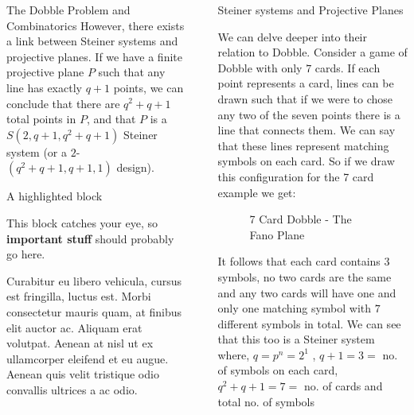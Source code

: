 \documentclass[final]{beamer}
\newlength{\sepwidth}
\newlength{\colwidth}
\newcommand{\separatorcolumn}{\begin{column}{\sepwidth}\end{column}}
\begin{document}
\begin{frame}[t]
\begin{columns}[t]
\begin{column}{\colwidth}
\begin{block}{The Dobble Problem and Combinatorics}
However, there exists a link between Steiner systems and projective planes. If we have a finite projective plane $P$ such that any line has exactly $q+1$ points, we can conclude that there are $q^2+q+1$ total points in $P$, and that $P$ is a $S(2, q+ 1, q^2 +q+ 1)$
Steiner system (or a $2$-$(q^2 +q+ 1, q + 1, 1)$ design)\cite{storme2006}.
  \end{block}

  \begin{alertblock}{A highlighted block}

    This block catches your eye, so \textbf{important stuff} should probably go
    here.

    Curabitur eu libero vehicula, cursus est fringilla, luctus est. Morbi
    consectetur mauris quam, at finibus elit auctor ac. Aliquam erat volutpat.
    Aenean at nisl ut ex ullamcorper eleifend et eu augue. Aenean quis velit
    tristique odio convallis ultrices a ac odio.

  \end{alertblock}

\end{column}

\separatorcolumn

\begin{column}{\colwidth}

  \begin{block}{Steiner systems and Projective Planes}

    We can delve deeper into their relation to Dobble.
Consider a game of Dobble with only $7$ cards. If each point represents a card, lines can be drawn such that if we were to chose any two of the seven points there is a line that connects them. We can say that these lines represent matching symbols on each card. So if we draw this configuration for the 7 card example we get:
    \begin{figure}
      \centering
      \caption{7 Card Dobble - The Fano Plane}
    \end{figure}
It follows that each card contains $3$ symbols, no two cards are the same and any two cards will have one and only one matching symbol with $7$ different symbols in total.
We can see that this too is a Steiner system where, $q = p^n = 2^1$ , $q + 1 = 3 =$ no. of symbols on each card, $q^2 + q + 1 = 7 =$ no. of cards and total no. of symbols


\end{block}
\end{column}
\end{columns}
\end{frame}
\end{document}

